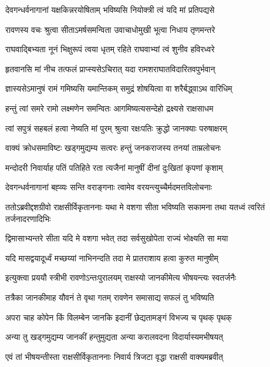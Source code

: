 \twolineshloka
{देवगन्धर्वनागानां यक्षकिन्नरयोषिताम्}
{भविष्यसि नियोक्त्री त्वं यदि मां प्रतिपद्यसे} %

\twolineshloka
{रावणस्य वचः श्रुत्वा सीताऽमर्षसमन्विता}
{उवाचाधोमुखी भूत्वा निधाय तृणमन्तरे} %

\twolineshloka
{राघवाद्बिभ्यता नूनं भिक्षुरूपं त्वया धृतम्}
{रहिते राघवाभ्यां त्वं शुनीव हविरध्वरे} %

\twolineshloka
{हृतवानसि मां नीच तत्फलं प्राप्स्यसेऽचिरात्}
{यदा रामशराघातविदारितवपुर्भवान्} %

\twolineshloka
{ज्ञास्यसेऽमानुषं रामं गमिष्यसि यमान्तिकम्}
{समुद्रं शोषयित्वा वा शरैर्बद्ध्वाऽथ वारिधिम्} %

\twolineshloka
{हन्तुं त्वां समरे रामो लक्ष्मणेन समन्वितः}
{आगमिष्यत्यसन्देहो द्रक्ष्यसे राक्षसाधम} %

\twolineshloka
{त्वां सपुत्रं सहबलं हत्वा नेष्यति मां पुरम्}
{श्रुत्वा रक्षःपतिः क्रुद्धो जानक्याः परुषाक्षरम्} %

\twolineshloka
{वाक्यं क्रोधसमाविष्टः खड्गमुद्यम्य सत्वरः}
{हन्तुं जनकराजस्य तनयां ताम्रलोचनः} %

\twolineshloka
{मन्दोदरी निवार्याह पतिं पतिहिते रता}
{त्यजैनां मानुषीं दीनां दुःखितां कृपणां कृशाम्} %

\twolineshloka
{देवगन्धर्वनागानां बह्व्यः सन्ति वराङ्गनाः}
{त्वामेव वरयन्त्युच्चैर्मदमत्तविलोचनाः} %

\threelineshloka
{ततोऽब्रवीद्दशग्रीवो राक्षसीर्विकृताननाः}
{यथा मे वशगा सीता भविष्यति सकामना}
{तथा यतध्वं त्वरितं तर्जनादरणादिभिः} %

\twolineshloka
{द्विमासाभ्यन्तरे सीता यदि मे वशगा भवेत्}
{तदा सर्वसुखोपेता राज्यं भोक्ष्यति सा मया} %

\twolineshloka
{यदि मासद्वयादूर्ध्वं मच्छय्यां नाभिनन्दति}
{तदा मे प्रातराशाय हत्वा कुरुत मानुषीम्} %

\twolineshloka
{इत्युक्त्वा प्रययौ स्त्रीभी रावणोऽन्तःपुरालयम्}
{राक्षस्यो जानकीमेत्य भीषयन्त्यः स्वतर्जनैः} %

\twolineshloka
{तत्रैका जानकीमाह यौवनं ते वृथा गतम्}
{रावणेन समासाद्य सफलं तु भविष्यति} %

\twolineshloka
{अपरा चाह कोपेन किं विलम्बेन जानकि}
{इदानीं छेद्यतामङ्गं विभज्य च पृथक् पृथक्} %

\twolineshloka
{अन्या तु खड्गमुद्यम्य जानकीं हन्तुमुद्यता}
{अन्या करालवदना विदार्यास्यमभीषयत्} %

\twolineshloka
{एवं तां भीषयन्तीस्ता राक्षसीर्विकृताननाः}
{निवार्य त्रिजटा वृद्धा राक्षसी वाक्यमब्रवीत्} %

